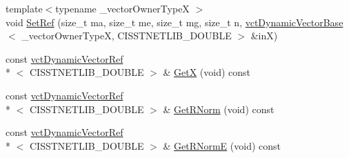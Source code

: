 \begin{DoxyCompactItemize}
\item 
{\footnotesize template$<$typename \-\_\-vector\-Owner\-Type\-X $>$ }\\void \hyperlink{classnmr_l_sq_lin_solution_dynamic_a594f0221acbf45854a7897ce6d998fd5}{Set\-Ref} (size\-\_\-t ma, size\-\_\-t me, size\-\_\-t mg, size\-\_\-t n, \hyperlink{classvct_dynamic_vector_base}{vct\-Dynamic\-Vector\-Base}$<$ \-\_\-vector\-Owner\-Type\-X, C\-I\-S\-S\-T\-N\-E\-T\-L\-I\-B\-\_\-\-D\-O\-U\-B\-L\-E $>$ \&in\-X)
\item 
const \hyperlink{classvct_dynamic_vector_ref}{vct\-Dynamic\-Vector\-Ref}\\*
$<$ C\-I\-S\-S\-T\-N\-E\-T\-L\-I\-B\-\_\-\-D\-O\-U\-B\-L\-E $>$ \& \hyperlink{classnmr_l_sq_lin_solution_dynamic_a0e7de21d17e32115b5776dc36fff5b24}{Get\-X} (void) const 
\item 
const \hyperlink{classvct_dynamic_vector_ref}{vct\-Dynamic\-Vector\-Ref}\\*
$<$ C\-I\-S\-S\-T\-N\-E\-T\-L\-I\-B\-\_\-\-D\-O\-U\-B\-L\-E $>$ \& \hyperlink{classnmr_l_sq_lin_solution_dynamic_a056dd5c8c1ddc75d327d16ee8849738e}{Get\-R\-Norm} (void) const 
\item 
const \hyperlink{classvct_dynamic_vector_ref}{vct\-Dynamic\-Vector\-Ref}\\*
$<$ C\-I\-S\-S\-T\-N\-E\-T\-L\-I\-B\-\_\-\-D\-O\-U\-B\-L\-E $>$ \& \hyperlink{classnmr_l_sq_lin_solution_dynamic_a9c4dae598654f878f32f06f808c32ac2}{Get\-R\-Norm\-E} (void) const 
\end{DoxyCompactItemize}
